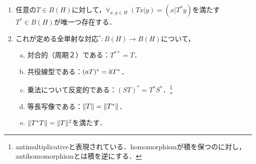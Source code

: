 \documentclass[uplatex,dvipdfmx]{jsreport}
\begin{document}
\begin{theorem}[随伴作用素の存在]\mbox{}\label{thm-existence-of-adjoint-operator}
    \begin{enumerate}
        \item 任意の$T\in B(H)$に対して，$\forall_{x,y\in H}\;(Tx|y)=(x|T^*y)$を満たす$T^*\in B(H)$が唯一つ存在する．
        \item これが定める全単射な対応${}^*:B(H)\to B(H)$について，
        \begin{enumerate}[(a)]
            \item 対合的（周期２）である：$T^{**}=T$．
            \item 共役線型である：$(aT)^*=\overline{a}T^*$．
            \item 乗法について反変的である：$(ST)^*=T^*S^*$．\footnote{antimultiplicativeと表現されている．homomorphismが積を保つのに対し，antihomomorphismとは積を逆にする．}
            \item 等長写像である：$\|T\|=\|T^*\|$．
            \item $\|T^*T\|=\|T\|^2$を満たす．
        \end{enumerate}
    \end{enumerate}
\end{theorem}
\end{document}
